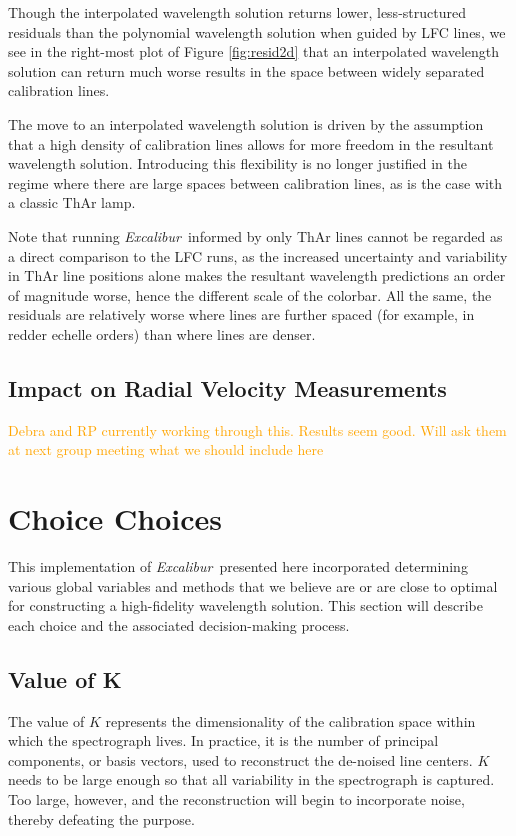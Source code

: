 \documentclass[modern]{aastex63}
\newcommand{\project}[1]{\textsl{#1}}
\newcommand{\name}{\project{Excalibur}}
\newcommand{\lz}[1]{\textcolor{orange}{#1}}
\begin{document}
Though the interpolated wavelength solution returns lower, less-structured residuals than the polynomial wavelength solution when guided by LFC lines, we see in the right-most plot of Figure \ref{fig:resid2d} that an interpolated wavelength solution can return much worse results in the space between widely separated calibration lines.

The move to an interpolated wavelength solution is driven by the assumption that a high density of calibration lines allows for more freedom in the resultant wavelength solution.  Introducing this flexibility is no longer justified in the regime where there are large spaces between calibration lines, as is the case with a classic ThAr lamp.

Note that running \name\ informed by only ThAr lines cannot be regarded as a direct comparison to the LFC runs, as the increased uncertainty and variability in ThAr line positions alone makes the resultant wavelength predictions an order of magnitude worse, hence the different scale of the colorbar.  All the same, the residuals are relatively worse where lines are further spaced (for example, in redder echelle orders) than where lines are denser.

\subsection{Impact on Radial Velocity Measurements}\label{sec:test-rv}
\lz{Debra and RP currently working through this.  Results seem good.  Will ask them at next group meeting what we should include here}


\section{Choice Choices} \label{sec:choices}
This implementation of \name\ presented here incorporated determining various global variables and methods that we believe are or are close to optimal for constructing a high-fidelity wavelength solution.  This section will describe each choice and the associated decision-making process.

\subsection{Value of K}
\label{sec:choice_k}
The value of $K$ represents the dimensionality of the calibration space within which the spectrograph lives.  In practice, it is the number of principal components, or basis vectors, used to reconstruct the de-noised line centers.  $K$ needs to be large enough so that all variability in the spectrograph is captured.  Too large, however, and the reconstruction will begin to incorporate noise, thereby defeating the purpose.
\end{document}
